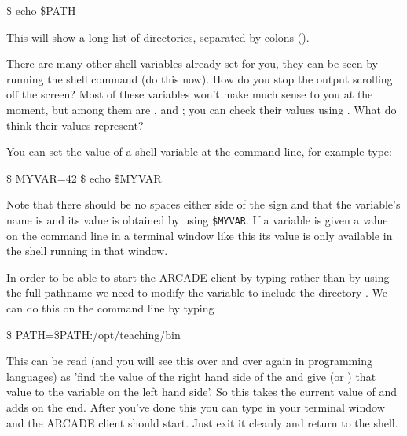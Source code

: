 \begin{ttoutenv}
\$ echo \$PATH
\end{ttoutenv}

This will show a long list of directories, separated by colons (\ttout{:}).

There are many other shell variables already set for you, they can be
seen by running the shell command  (do this now). How do you stop the
output scrolling off the screen? Most of these variables won't make
much sense to you at the moment, but among them are ,
 and ; you can check their values using
. What do think their values represent?

You can set the value of a shell variable at the command line, for example type:

\begin{ttoutenv}
\$ MYVAR=42
\$ echo \$MYVAR
\end{ttoutenv}


Note that there should be no spaces either side of the \ttout{=} sign and that the variable's name is  and its value is obtained  by using \verb+$MYVAR+. If a variable is given a value on the command line in a terminal window like this its value is only available in the shell running in that window.

In order to be able to start the ARCADE client by typing  rather than by using the full pathname  we need to modify the  variable to include the directory . We can do this on the command line by typing

\begin{ttoutenv}
\$ PATH=\$PATH:/opt/teaching/bin
\end{ttoutenv}

This can be read (and you will see this over and over again in
programming languages) as 'find the value of the right hand side of
the \ttout{=} and give (or ) that value to the variable on the left hand side'. So this takes the current value of  and adds
 on the end. After you've done this you can
type  in your terminal window and the ARCADE client
should start. Just exit it cleanly and return to the shell.


